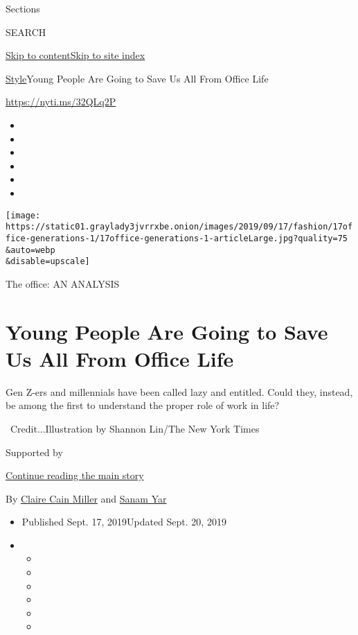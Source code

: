 Sections

SEARCH

\protect\hyperlink{site-content}{Skip to
content}\protect\hyperlink{site-index}{Skip to site index}

\href{/section/style}{Style}\textbar{}Young People Are Going to Save Us
All From Office Life

\url{https://nyti.ms/32QLq2P}

\begin{itemize}
\item
\item
\item
\item
\item
\item
\end{itemize}

\texttt{[image: https://static01.graylady3jvrrxbe.onion/images/2019/09/17/fashion/17office-generations-1/17office-generations-1-articleLarge.jpg?quality=75\\\&auto=webp\\\&disable=upscale]}

The office: AN ANALYSIS

\hypertarget{young-people-are-going-to-save-us-all-from-office-life}{%
\section{Young People Are Going to Save Us All From Office
Life}\label{young-people-are-going-to-save-us-all-from-office-life}}

Gen Z-ers and millennials have been called lazy and entitled. Could
they, instead, be among the first to understand the proper role of work
in life?

~Credit...Illustration by Shannon Lin/The New York Times

Supported by

\protect\hyperlink{after-sponsor}{Continue reading the main story}

By
\href{https://www.nytimes3xbfgragh.onion/by/claire-cain-miller}{Claire
Cain Miller} and
\href{https://www.nytimes3xbfgragh.onion/by/sanam-yar}{Sanam Yar}

\begin{itemize}
\item
  Published Sept. 17, 2019Updated Sept. 20, 2019
\item
  \begin{itemize}
  \item
  \item
  \item
  \item
  \item
  \item
  \end{itemize}
\end{itemize}

